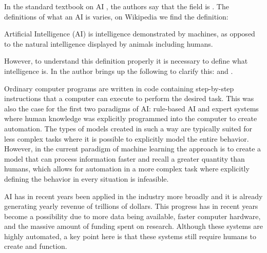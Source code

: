 \documentclass[12pt,A4]{report}
\theoremstyle{definition}
\begin{document}
In the standard textbook on AI \autocite{Russel Norvig}, the authors say that the field is . The definitions of what an AI is varies, on Wikipedia we find the definition\autocite{Wikipedia}:
\begin{displayquote}
Artificial Intelligence (AI) is intelligence demonstrated by machines, as opposed to the natural intelligence displayed by animals including humans.
\end{displayquote}
However, to understand this definition properly it is necessary to define what intelligence is. In \autocite{Tänkande Maskiner} the author brings up the following to clarify this:  and . 


Ordinary computer programs are written in code containing step-by-step instructions that a computer can execute to perform the desired task. This was also the case for the first two paradigms of AI: rule-based AI and expert systems where human knowledge was explicitly programmed into the computer to create automation\autocite{Superintelligence}. The types of models created in such a way are typically suited for less complex tasks where it is possible to explicitly model the entire behavior. However, in the current paradigm of machine learning the approach is to create a model that can process information faster and recall a greater quantity than humans, which allows for automation in a more complex task where explicitly defining the behavior in every situation is infeasible. 

AI has in recent years been applied in the industry more broadly and it is already generating yearly revenue of trillions of dollars\autocite{Russel Norvig}. This progress has in recent years become a possibility due to more data being available, faster computer hardware, and the massive amount of funding spent on research. Although these systems are highly automated, a key point here is that these systems still require humans to create and function.
\end{document}
